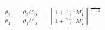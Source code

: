 \documentclass[10pt]{article}
\begin{document}
\begin{align*}\frac{\rho_2}{\rho_1}
=
\frac{\rho_2/\rho_0}{\rho_1/\rho_0}
=
\left[
\frac{
1 + \frac{\gamma-1}{2} M_1^{2}
}
{
1 + \frac{\gamma-1}{2} M_2^{2}
}
\right]^{\frac{1}{\gamma-1}}\end{align*}
\end{document}
